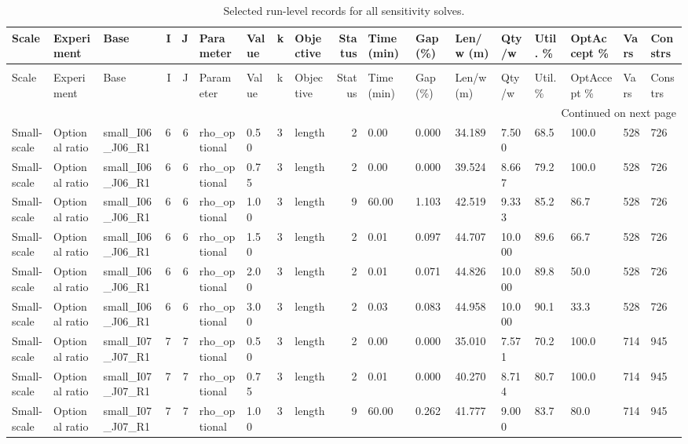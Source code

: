 \begin{longtable}{lllrrllllrllllllll}
\caption{Selected run-level records for all sensitivity solves.} \label{tab:app_run_level_selected} \\
\toprule
Scale & Experiment & Base & I & J & Parameter & Value & k & Objective & Status & Time (min) & Gap (\%) & Len/w (m) & Qty/w & Util. \% & OptAccept \% & Vars & Constrs \\
\midrule
\endfirsthead
\caption[]{Selected run-level records for all sensitivity solves.} \\
\toprule
Scale & Experiment & Base & I & J & Parameter & Value & k & Objective & Status & Time (min) & Gap (\%) & Len/w (m) & Qty/w & Util. \% & OptAccept \% & Vars & Constrs \\
\midrule
\endhead
\midrule
\multicolumn{18}{r}{Continued on next page} \\
\midrule
\endfoot
\bottomrule
\endlastfoot
Small-scale & Optional ratio & small\_I06\_J06\_R1 & 6 & 6 & rho\_optional & 0.50 & 3 & length & 2 & 0.00 & 0.000 & 34.189 & 7.500 & 68.5 & 100.0 & 528 & 726 \\
Small-scale & Optional ratio & small\_I06\_J06\_R1 & 6 & 6 & rho\_optional & 0.75 & 3 & length & 2 & 0.00 & 0.000 & 39.524 & 8.667 & 79.2 & 100.0 & 528 & 726 \\
Small-scale & Optional ratio & small\_I06\_J06\_R1 & 6 & 6 & rho\_optional & 1.00 & 3 & length & 9 & 60.00 & 1.103 & 42.519 & 9.333 & 85.2 & 86.7 & 528 & 726 \\
Small-scale & Optional ratio & small\_I06\_J06\_R1 & 6 & 6 & rho\_optional & 1.50 & 3 & length & 2 & 0.01 & 0.097 & 44.707 & 10.000 & 89.6 & 66.7 & 528 & 726 \\
Small-scale & Optional ratio & small\_I06\_J06\_R1 & 6 & 6 & rho\_optional & 2.00 & 3 & length & 2 & 0.01 & 0.071 & 44.826 & 10.000 & 89.8 & 50.0 & 528 & 726 \\
Small-scale & Optional ratio & small\_I06\_J06\_R1 & 6 & 6 & rho\_optional & 3.00 & 3 & length & 2 & 0.03 & 0.083 & 44.958 & 10.000 & 90.1 & 33.3 & 528 & 726 \\
Small-scale & Optional ratio & small\_I07\_J07\_R1 & 7 & 7 & rho\_optional & 0.50 & 3 & length & 2 & 0.00 & 0.000 & 35.010 & 7.571 & 70.2 & 100.0 & 714 & 945 \\
Small-scale & Optional ratio & small\_I07\_J07\_R1 & 7 & 7 & rho\_optional & 0.75 & 3 & length & 2 & 0.01 & 0.000 & 40.270 & 8.714 & 80.7 & 100.0 & 714 & 945 \\
Small-scale & Optional ratio & small\_I07\_J07\_R1 & 7 & 7 & rho\_optional & 1.00 & 3 & length & 9 & 60.00 & 0.262 & 41.777 & 9.000 & 83.7 & 80.0 & 714 & 945 \\

\end{longtable}

